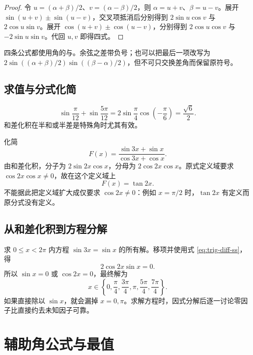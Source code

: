 \documentclass[UTF8]{ctexart}
\begin{document}
\begin{proof}
令 $u=(\alpha+\beta)/2$、$v=(\alpha-\beta)/2$，则 $\alpha=u+v$、$\beta=u-v$。展开 $\sin(u+v)\pm\sin(u-v)$，交叉项抵消后分别得到 $2\sin u\cos v$ 与 $2\cos u\sin v$。展开 $\cos(u+v)\pm\cos(u-v)$，分别得到 $2\cos u\cos v$ 与 $-2\sin u\sin v$。代回 $u,v$ 即得四式。
\end{proof}

四条公式都使用角的与。余弦之差带负号；也可以把最后一项改写为 $2\sin((\alpha+\beta)/2)\sin((\beta-\alpha)/2)$，但不可只交换差角而保留原符号。

\subsection{求值与分式化简}

\begin{example}[和式求值]
\[
  \sin\frac\pi{12}+\sin\frac{5\pi}{12}
  =2\sin\frac\pi4\cos\left(-\frac\pi6\right)
  =\frac{\sqrt6}{2}.
\]
和差化积在半和或半差是特殊角时尤其有效。
\end{example}

\begin{example}[约分前保留定义域]
化简
\[
  F(x)=\frac{\sin3x+\sin x}{\cos3x+\cos x}.
\]
由和差化积，分子为 $2\sin2x\cos x$，分母为 $2\cos2x\cos x$。原式定义域要求 $\cos2x\cos x\ne0$，故在这个定义域上
\[
  F(x)=\tan2x.
\]
不能据此把定义域扩大成仅要求 $\cos2x\ne0$：例如 $x=\pi/2$ 时，$\tan2x$ 有定义而原分式没有定义。
\end{example}

\subsection{从和差化积到方程分解}

\begin{example}[完整保留各个因子产生的解]
求 $0\le x<2\pi$ 内方程 $\sin3x=\sin x$ 的所有解。移项并使用式 \eqref{eq:trig-diff-ss}，得
\[
  2\cos2x\sin x=0.
\]
所以 $\sin x=0$ 或 $\cos2x=0$，最终解为
\[
  x\in\left\{0,\frac\pi4,\frac{3\pi}4,\pi,
                    \frac{5\pi}4,\frac{7\pi}4\right\}.
\]
如果直接除以 $\sin x$，就会漏掉 $x=0,\pi$。求解方程时，因式分解后逐一讨论零因子比直接约去未知因子可靠。
\end{example}

\section{辅助角公式与最值}
\label{sec:trig-auxiliary}
\end{document}
